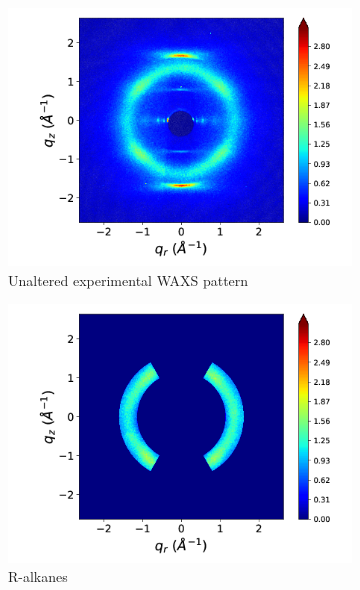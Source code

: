 \documentclass[journal=jpcbfk,manusciprt=article]{achemso}
\begin{document}
  \begin{figure}[!htb]
  \centering
  \begin{subfigure}{0.45\linewidth}
  \centering
  \includegraphics[width=\textwidth]{WAXS_raw.png}
  \caption{Unaltered experimental WAXS pattern}\label{fig:unaltered}
  \end{subfigure}
  \begin{subfigure}{0.45\linewidth}
  \centering
  \includegraphics[width=\textwidth]{ralkanes.png}
  \caption{R-alkanes}\label{fig:ralkanes}
  \end{subfigure}
  \begin{subfigure}{0.45\linewidth}
  \centering

\end{subfigure}
\end{figure}
\end{document}
